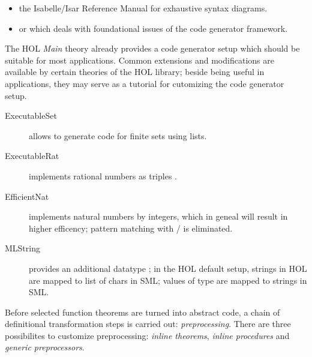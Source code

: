 \begin{isabellebody}
\begin{isamarkuptext}
  \begin{itemize}

  \item the Isabelle/Isar Reference Manual \cite{isabelle-isar-ref}
    for exhaustive syntax diagrams.
  \item or  which deals with foundational issues
    of the code generator framework.

  \end{itemize}%
\end{isamarkuptext}%
\isamarkuptrue%
%
\isamarkuptrue%
%
\begin{isamarkuptext}%
The HOL \emph{Main} theory already provides a code generator setup
  which should be suitable for most applications. Common extensions
  and modifications are available by certain theories of the HOL
  library; beside being useful in applications, they may serve
  as a tutorial for cutomizing the code generator setup.

  \begin{description}

    \item[ExecutableSet] allows to generate code
       for finite sets using lists.
    \item[ExecutableRat] implements rational
       numbers as triples .
    \item[EfficientNat] implements natural numbers by integers,
       which in geneal will result in higher efficency; pattern
       matching with  / 
       is eliminated. \label{eff_nat}
    \item[MLString] provides an additional datatype ;
       in the HOL default setup, strings in HOL are mapped to list
       of chars in SML; values of type  are
       mapped to strings in SML.

  \end{description}%
\end{isamarkuptext}%
\isamarkuptrue%
%
\isamarkuptrue%
%
\begin{isamarkuptext}%
Before selected function theorems are turned into abstract
  code, a chain of definitional transformation steps is carried
  out: \emph{preprocessing}. There are three possibilites
  to customize preprocessing: \emph{inline theorems},
  \emph{inline procedures} and \emph{generic preprocessors}.


\end{isamarkuptext}
\end{isabellebody}
